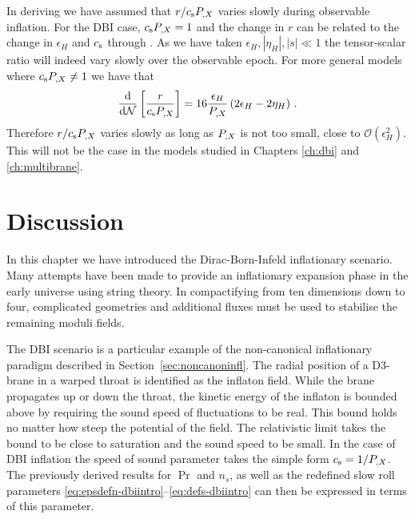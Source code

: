 In deriving  we have assumed that $r/c_\mathrm{s} P_{,X}$ varies slowly during
observable inflation. For the DBI case, $c_\mathrm{s} P_{,X} = 1$ and the change in $r$ can be related to the
change in $\epsilon_H$ and $c_\mathrm{s}$ through . As we have taken $\epsilon_H,
|\eta_H|,|s|\ll 1$ the tensor-scalar ratio will indeed vary slowly over the observable epoch.
% 
For more general models where $c_\mathrm{s} P_{,X} \ne 1$ we have that
% 
\begin{equation}
 \frac{\mathrm{d} }{\mathrm{d} \mathcal{N}}\left[ \frac{r}{c_\mathrm{s} P_{,X}}\right] = 16\frac{\epsilon_H}{P_{,X}}\left( 2\epsilon_H
-2\eta_H\right)\,.
\end{equation}
% 
Therefore $r/c_\mathrm{s}P_{,X}$ varies slowly as long as $P_{,X}$ is not too small, \iec close to
$\mathcal{O}(\epsilon_H^2)$. This will not be the case in the models studied in Chapters
\ref{ch:dbi} and \ref{ch:multibrane}.


\section{Discussion}
\label{sec:summary-dbiintro}
In this chapter we have introduced the Dirac-Born-Infeld inflationary scenario.
Many attempts have been made to provide an inflationary expansion phase in the
early universe using string theory. In compactifying from ten dimensions down to
four,
complicated geometries and additional fluxes must be used to stabilise the
remaining moduli fields. 

The DBI scenario 
is a particular example of the non-canonical inflationary para\-digm described in
Section~\ref{sec:noncanoninfl}. 
The radial position of a D3-brane in a warped throat is identified as the inflaton field. While the
brane propagates up or down the throat, the kinetic energy of the inflaton is bounded
above by requiring
the sound speed of fluctuations to be real. This bound holds no matter how steep the potential of
the field. The relativistic limit takes the bound to be close to saturation and the sound speed to
be small.
% 
In the case of DBI inflation the speed of sound
parameter
takes the simple form $c_\mathrm{s} = 1/P_{,X}$. The previously derived
results for $\Pr$ and $n_s$, as well as the redefined slow roll parameters 
\eqref{eq:epsdefn-dbiintro}--\eqref{eq:defs-dbiintro} can then be expressed in terms
of this parameter. 

